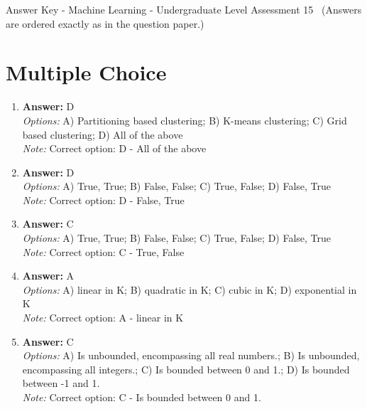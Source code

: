 \documentclass[12pt]{article}
\begin{document}
\begin{center}
Answer Key - Machine Learning - Undergraduate Level Assessment 15 \
\small (Answers are ordered exactly as in the question paper.)
\end{center}

\section*{Multiple Choice}
\begin{enumerate}[label=\arabic*.]
\item \textbf{Answer:} D
\\ \textit{Options:} A) Partitioning based clustering; B) K-means clustering; C) Grid based clustering; D) All of the above
\\ \textit{Note:} Correct option: D - All of the above
\item \textbf{Answer:} D
\\ \textit{Options:} A) True, True; B) False, False; C) True, False; D) False, True
\\ \textit{Note:} Correct option: D - False, True
\item \textbf{Answer:} C
\\ \textit{Options:} A) True, True; B) False, False; C) True, False; D) False, True
\\ \textit{Note:} Correct option: C - True, False
\item \textbf{Answer:} A
\\ \textit{Options:} A) linear in K; B) quadratic in K; C) cubic in K; D) exponential in K
\\ \textit{Note:} Correct option: A - linear in K
\item \textbf{Answer:} C
\\ \textit{Options:} A) Is unbounded, encompassing all real numbers.; B) Is unbounded, encompassing all integers.; C) Is bounded between 0 and 1.; D) Is bounded between -1 and 1.
\\ \textit{Note:} Correct option: C - Is bounded between 0 and 1.
\end{enumerate}
\end{document}

